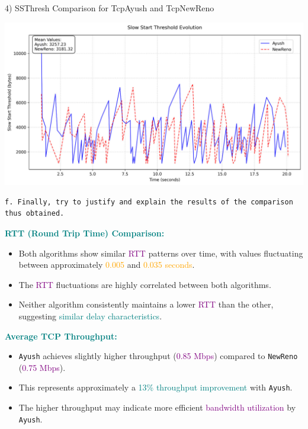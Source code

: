 \documentclass[11pt,a4paper]{article}
\begin{document}
4) SSThresh Comparison for TcpAyush and TcpNewReno
\begin{center}
    \includegraphics[width=1\columnwidth]{images/ss-comp.jpg}
\end{center}

\begin{verbatim}
f. Finally, try to justify and explain the results of the comparison thus obtained.
\end{verbatim}

\textbf{\textcolor{teal}{RTT (Round Trip Time) Comparison:}}

\begin{itemize}
    \item Both algorithms show similar \textcolor{purple}{RTT} patterns over time, with values fluctuating between approximately \textcolor{orange}{0.005} and \textcolor{orange}{0.035 seconds}.
    \item The \textcolor{purple}{RTT} fluctuations are highly correlated between both algorithms.
    \item Neither algorithm consistently maintains a lower \textcolor{purple}{RTT} than the other, suggesting \textcolor{teal}{similar delay characteristics}.
\end{itemize}

\textbf{\textcolor{teal}{Average TCP Throughput:}}

\begin{itemize}
    \item \texttt{Ayush} achieves slightly higher throughput (\textcolor{purple}{0.85 Mbps}) compared to \texttt{NewReno} (\textcolor{purple}{0.75 Mbps}).
    \item This represents approximately a \textcolor{teal}{13\% throughput improvement} with \texttt{Ayush}.
    \item The higher throughput may indicate more efficient \textcolor{purple}{bandwidth utilization} by \texttt{Ayush}.
\end{itemize}
\end{document}
